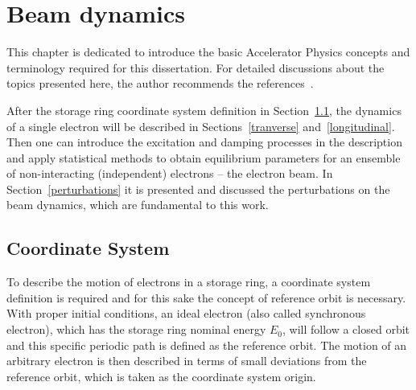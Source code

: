 \chapter{Beam dynamics}
This chapter is dedicated to introduce the basic Accelerator Physics concepts and terminology required for this dissertation. For detailed discussions about the topics presented here, the author recommends the references~\cite{sands1970physics, wiedemann2007physics}.

After the storage ring coordinate system definition in Section~\ref{coord}, the dynamics of a single electron will be described in Sections~\ref{tranverse} and~\ref{longitudinal}. Then one can introduce the excitation and damping processes in the description and apply statistical methods to obtain equilibrium parameters for an ensemble of non-interacting (independent) electrons -- the electron beam. In Section~\ref{perturbations} it is presented and discussed the perturbations on the beam dynamics, which are fundamental to this work.
\section{Coordinate System}\label{coord}
To describe the motion of electrons in a storage ring, a coordinate system definition is required and for this sake the concept of reference orbit is necessary. With proper initial conditions, an ideal electron (also called synchronous electron), which has the storage ring nominal energy $E_0$, will follow a closed orbit and this specific periodic path is defined as the reference orbit. The motion of an arbitrary electron is then described in terms of small deviations from the reference orbit, which is taken as the coordinate system origin. 

